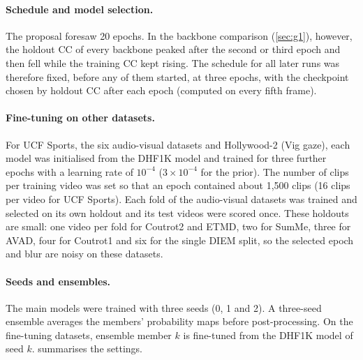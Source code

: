 \paragraph{Schedule and model selection.} The proposal foresaw 20 epochs. In
the backbone comparison (\cref{sec:g1}), however, the holdout \acrshort{CC} of every
backbone peaked after the second or third epoch and then fell while the
training \acrshort{CC} kept rising. The schedule for all later runs was therefore fixed,
before any of them started, at three epochs, with the checkpoint chosen by
holdout \acrshort{CC} after each epoch (computed on every fifth frame).

\paragraph{Fine-tuning on other datasets.} For UCF Sports, the six
audio-visual datasets and Hollywood-2 (Vig gaze), each model was initialised
from the DHF1K model and trained for three further epochs with a learning rate
of $10^{-4}$ ($3\times10^{-4}$ for the prior). The number of clips per training
video was set so that an epoch contained about 1,500 clips (16 clips per video
for UCF Sports). Each fold of the audio-visual datasets was trained and
selected on its own holdout and its test videos were scored once. These
holdouts are small: one video per fold for Coutrot2 and ETMD, two for SumMe,
three for AVAD, four for Coutrot1 and six for the single DIEM split, so the
selected epoch and blur are noisy on these datasets.

\paragraph{Seeds and ensembles.} The main models were trained with three seeds
(0, 1 and 2). A three-seed ensemble averages the members' probability maps
before post-processing. On the fine-tuning datasets, ensemble member $k$ is
fine-tuned from the DHF1K model of seed $k$.  summarises the
settings.

